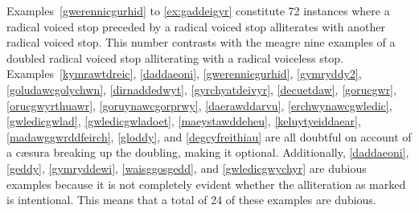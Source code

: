 Examples~\ref{gwerennicgurhid} to \ref{ex:gaddeigyr} constitute  72 instances where a radical voiced stop preceded by a radical voiced stop alliterates with another radical voiced stop. This number contrasts with the meagre nine examples of a doubled radical voiced stop alliterating with a radical voiceless stop.
Examples~\ref{kymrawtdreic},   \ref{daddaeoni},  \ref{gwerennicgurhid},  \ref{gymryddy2}, \ref{goludawcgolychwn},  \ref{dirnaddedwyt},  \ref{gyrchyatdeivyr},  \ref{decuetdaw},  \ref{gorucgwr},  \ref{orucgwyrthuawr},  \ref{goruynawcgorprwy},  \ref{daerawddarvu},  \ref{erchwynawcgwledic},  \ref{gwledicgwlad},  \ref{gwledicgwladoet},  \ref{maeystawddeheu},  \ref{keluytyeiddaear},  \ref{madawggwrddfeirch}, \ref{gloddy}, and \ref{degcyfreithiau} are all doubtful on account of a cæsura breaking up the doubling, making it optional. Additionally, \ref{daddaeoni}, \ref{geddy}, \ref{gymryddewi}, \ref{waisggosgedd}, and \ref{gwledicgwychyr} are dubious examples because it is not completely evident whether the alliteration as marked is intentional. This means that a total of 24 of these examples are dubious.
